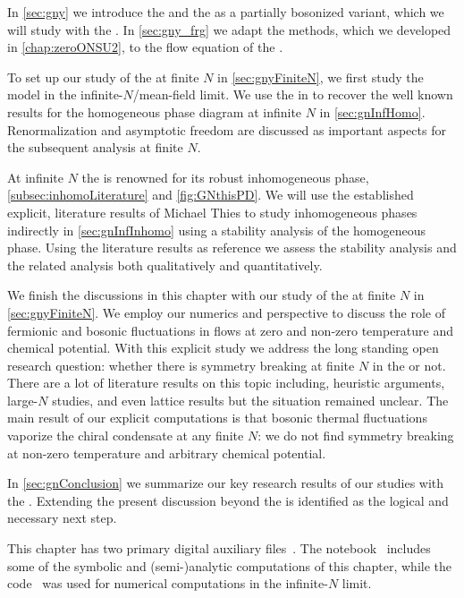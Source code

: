 In \cref{sec:gny} we introduce the \gnm{} and the \gnym{} as a partially bosonized variant, which we will study with the \frg{}.
In \cref{sec:gny_frg} we adapt the \cfd{} methods, which we developed in \cref{chap:zeroONSU2}, to the \lpa{} flow equation of the \gnym{}.

To set up our \frg{} study of the \gnym{} at finite $N$ in \cref{sec:gnyFiniteN}, we first study the model in the infinite-$N$/mean-field limit.
We use the \frg{} in \lpa{} to recover the well known results for the homogeneous phase diagram at infinite $N$ in \cref{sec:gnInfHomo}.
Renormalization and asymptotic freedom are discussed as important aspects for the subsequent analysis at finite $N$.

At infinite $N$ the \gnm{} is renowned for its robust inhomogeneous phase, \cf{} \cref{subsec:inhomoLiterature} and \cref{fig:GNthisPD}.
We will use the established explicit, literature results of Michael Thies \etal{} to study inhomogeneous phases indirectly in \cref{sec:gnInfInhomo} using a stability analysis of the homogeneous phase.
Using the literature results as reference we assess the stability analysis and the related  analysis both qualitatively and quantitatively.

We finish the discussions in this chapter with our \frg{} study of the \gnym{} at finite $N$ in \cref{sec:gnyFiniteN}.
We employ our \cfd{} numerics and perspective to discuss the role of fermionic and bosonic fluctuations in \frg{} flows at zero and non-zero temperature and chemical potential.
With this explicit \lpa{} study we address the long standing open research question: whether there is symmetry breaking at finite $N$ in the \gnm{} or not.
There are a lot of literature results on this topic including, heuristic arguments, large-$N$ studies, and even lattice results but the situation remained unclear.
The main result of our explicit computations is that bosonic thermal fluctuations vaporize the chiral condensate at any finite $N$: we do not find symmetry breaking at non-zero temperature and arbitrary chemical potential.

In \cref{sec:gnConclusion} we summarize our key research results of our studies with the \gnyBm{}.
Extending the present discussion beyond the \lpa{} is identified as the logical and necessary next step.

This chapter has two primary digital auxiliary files~\cite{Steil:2023GNnotebook,Steil:2023GNcpp}.
The \WAM{} notebook~\cite{Steil:2023GNnotebook} includes some of the symbolic and (semi-)analytic computations of this chapter, while the \Cpp{} code~\cite{Steil:2023GNcpp} was used for numerical computations in the infinite-$N$ limit.
